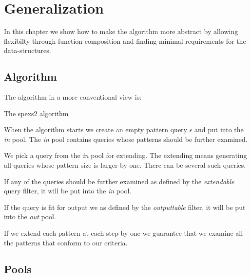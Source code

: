 \chapter{Generalization}

In this chapter we show how to make the algorithm more 
abstract by allowing flexibilty through function composition and
finding minimal requirements for the data-structures.

\section{Algorithm}

The algorithm in a more conventional view is:

\begin{algorithm}[H]
	\caption{The spexs2 algorithm}
\begin{algorithmic}[1]
			\EndIf
			\EndIf
		\EndFor
	\EndWhile
\end{algorithmic}
\end{algorithm}

When the algorithm starts we create an empty pattern query $\epsilon$ and put 
into the \emph{in} pool. The \emph{in} pool contains queries whose patterns
should be further examined.

We pick a query from the \emph{in} pool for extending. The extending means
generating all queries whose pattern size is larger by one. There can be
several such queries.

If any of the queries should be further examined as defined by the
\emph{extendable} query filter, it will be put into the \emph{in} pool.

If the query is fit for output we as defined by the \emph{outputtable} filter,
it will be put into the \emph{out} pool.

If we extend each pattern at each step by one we guarantee that we
examine all the patterns that conform to our criteria.

\section{Pools}

